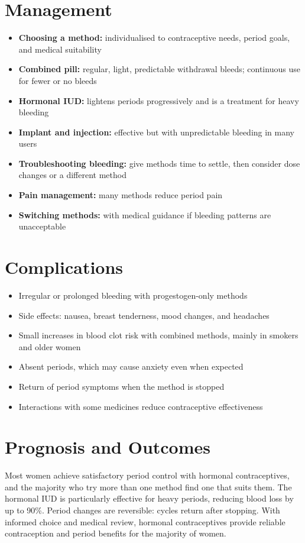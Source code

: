 \section*{Management}
\begin{itemize}
    \item \textbf{Choosing a method:} individualised to contraceptive needs, period goals, and medical suitability
    \item \textbf{Combined pill:} regular, light, predictable withdrawal bleeds; continuous use for fewer or no bleeds
    \item \textbf{Hormonal IUD:} lightens periods progressively and is a treatment for heavy bleeding
    \item \textbf{Implant and injection:} effective but with unpredictable bleeding in many users
    \item \textbf{Troubleshooting bleeding:} give methods time to settle, then consider dose changes or a different method
    \item \textbf{Pain management:} many methods reduce period pain
    \item \textbf{Switching methods:} with medical guidance if bleeding patterns are unacceptable
\end{itemize}

\section*{Complications}
\begin{itemize}
    \item Irregular or prolonged bleeding with progestogen-only methods
    \item Side effects: nausea, breast tenderness, mood changes, and headaches
    \item Small increases in blood clot risk with combined methods, mainly in smokers and older women
    \item Absent periods, which may cause anxiety even when expected
    \item Return of period symptoms when the method is stopped
    \item Interactions with some medicines reduce contraceptive effectiveness
\end{itemize}

\section*{Prognosis and Outcomes}
Most women achieve satisfactory period control with hormonal contraceptives, and the majority who try more than one method find one that suits them. The hormonal IUD is particularly effective for heavy periods, reducing blood loss by up to 90\%. Period changes are reversible: cycles return after stopping. With informed choice and medical review, hormonal contraceptives provide reliable contraception and period benefits for the majority of women.


